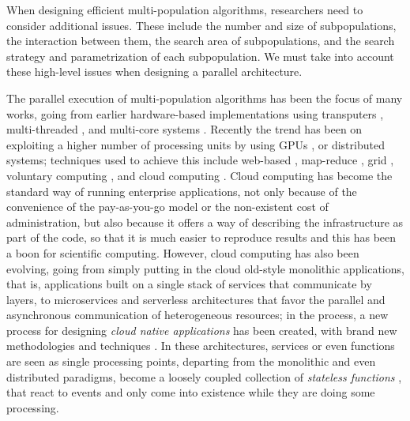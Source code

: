 \documentclass[review]{elsarticle}
\begin{document}
When designing efficient multi-population algorithms, researchers need to
consider additional issues. These include the number and size of subpopulations,
the interaction between them, the search area of subpopulations, and the search
strategy and parametrization of each subpopulation. We must take into account
these high-level issues when designing a parallel architecture. 

The parallel execution of multi-population algorithms has been the focus of many
works,  going from earlier hardware-based implementations using transputers \cite{gorges1990explicit},
multi-threaded \cite{merelo2019scaling}, and multi-core systems \cite{Serrano2008,lai2019adaptive}. %
Recently the trend has been on exploiting a higher number of processing units 
by using GPUs \cite{tan2015survey,li2007efficient}, or distributed systems; techniques used to achieve this include 
web-based \cite{JSON}, map-reduce \cite{fazenda2012},  grid \cite{munawar2010design,Gonzalez09}, 
voluntary computing \cite{MilkyWay}, and cloud computing 
\cite{GValdez2015,salza2019speed,valenzuela2015implementing,Sherry2012,FlexGP}. %
Cloud computing has become the standard way of running enterprise applications, not
only because of the convenience of the pay-as-you-go model or the non-existent
cost of administration, but also because it offers a way of describing the
infrastructure as part of the code, so that it is much easier to reproduce
results and this has been a boon for scientific computing.  However,  cloud computing
has also been evolving, going from simply putting in the cloud old-style monolithic applications, that is,
applications built on a single stack of services that communicate by layers, to
microservices \cite{microservices} and serverless architectures \cite{varghese2018next, Varghese2018849} that favor the parallel and
asynchronous communication of heterogeneous resources; in the process, 
a new process for designing {\em cloud native applications} has been created, 
with brand new methodologies and techniques \cite{Baldini2016287}. In these architectures,
services or even functions are seen as single processing points,  departing
from the monolithic and even distributed paradigms, become a loosely coupled collection of 
{\em stateless functions} \cite{malawski2017serverless}, that react to events and only come into existence while they 
are doing some processing. %
\end{document}
